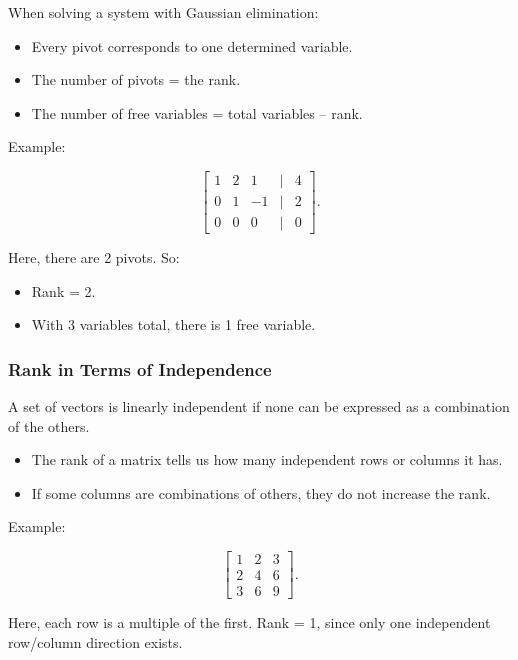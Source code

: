 \documentclass[
  letterpaper,
  DIV=11,
  numbers=noendperiod]{scrreprt}
\providecommand{\tightlist}{%
  \setlength{\itemsep}{0pt}\setlength{\parskip}{0pt}}
\begin{document}
When solving a system with Gaussian elimination:

\begin{itemize}
\tightlist
\item
  Every pivot corresponds to one determined variable.
\item
  The number of pivots = the rank.
\item
  The number of free variables = total variables -- rank.
\end{itemize}

Example:

\[
\begin{bmatrix}  
1 & 2 & 1 & | & 4 \\  
0 & 1 & -1 & | & 2 \\  
0 & 0 & 0 & | & 0  
\end{bmatrix}.
\]

Here, there are 2 pivots. So:

\begin{itemize}
\tightlist
\item
  Rank = 2.
\item
  With 3 variables total, there is 1 free variable.
\end{itemize}

\subsubsection{Rank in Terms of
Independence}\label{rank-in-terms-of-independence}

A set of vectors is linearly independent if none can be expressed as a
combination of the others.

\begin{itemize}
\tightlist
\item
  The rank of a matrix tells us how many independent rows or columns it
  has.
\item
  If some columns are combinations of others, they do not increase the
  rank.
\end{itemize}

Example:

\[
\begin{bmatrix}  
1 & 2 & 3 \\  
2 & 4 & 6 \\  
3 & 6 & 9  
\end{bmatrix}.
\]

Here, each row is a multiple of the first. Rank = 1, since only one
independent row/column direction exists.
\end{document}
